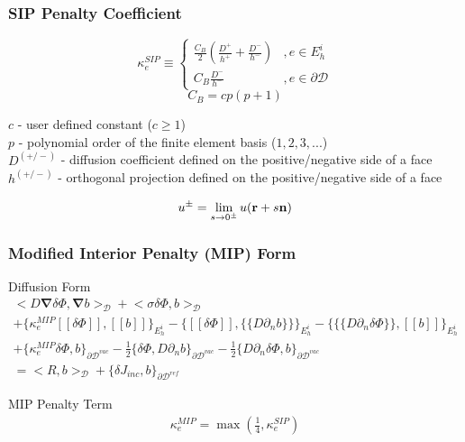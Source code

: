 \documentclass[compress,10pt]{beamer}
\renewcommand{\vec}[1]{\mathbf{#1}}
\begin{document}
\begin{frame}[t]\frametitle{SIP Penalty Coefficient}
\begin{block}{}{
	\begin{equation*}
		\kappa_e^{SIP} \equiv 
		\begin{cases}
		\frac{C_B}{2} \left(  \frac{D^+}{h^+} + \frac{D^-}{h^-}  \right) & , e \in E_h^i \\
		C_B \frac{D^-}{h^-}  & , e \in \partial \mathcal{D}
		\end{cases}
	\end{equation*}}
	\begin{equation*}
		C_B = c p (p+1)
	\end{equation*}
\end{block}
\begin{block}{}
$c$ - user defined constant ($c \geq 1$) \\
$p$ - polynomial order of the finite element basis ($1,2,3,...$) \\
$D^{(+/-)}$ - diffusion coefficient defined on the positive/negative side of a face\\
$h^{(+/-)}$ - orthogonal projection defined on the positive/negative side of a face
\end{block}
\begin{block}{}
	\begin{equation*}
		u^{\pm} = \lim_{s \rightarrow 0^{\pm}} u ({\bf r} + s {\bf n})
	\end{equation*}
\end{block}
\end{frame}
\begin{frame}[t]\frametitle{Modified Interior Penalty (MIP) Form}
	\begin{block}{Diffusion Form}{\footnotesize
		\begin{gather*}
			 \Big<  D \vec{\nabla} \delta \Phi , \vec{\nabla} b  \Big>_{\mathcal{D}} + \Big<  \sigma \delta  \Phi ,  b  \Big>_{\mathcal{D}}    \\
			+  \Big\{ \kappa_e^{MIP} [\![ \delta  \Phi ]\!] , [\![  b ]\!]\Big\}_{E_h^i} - \Big\{  [\![  \delta \Phi ]\!] , \{\!\{  D \partial_n b \}\!\}\Big\}_{E_h^i} -\Big\{ \{\!\{  D \partial_n \delta \Phi \}\!\} , [\![ b ]\!]\Big\}_{E_h^i} \\
			+ \Big\{ \kappa_e^{MIP} \delta  \Phi ,   b \Big\}_{\partial \mathcal{D}^{vac}} -  \frac{1}{2} \Big\{  \delta \Phi  ,  D \partial_n b \Big\}_{\partial \mathcal{D}^{vac}} -  \frac{1}{2} \Big\{   D 				\partial_n \delta \Phi ,   b \Big\}_{\partial \mathcal{D}^{vac}}  \\
 = \Big<  R , b  \Big>_{\mathcal{D}}  +  \Big\{  \delta J_{inc}, b  \Big\}_{\partial \mathcal{D}^{ref}}
        	\end{gather*} }
\end{block}
	\begin{block}{MIP Penalty Term}{\footnotesize
		\begin{align*}
			\kappa_e^{MIP} = \max(\frac{1}{4},  \kappa_e^{SIP})
		\end{align*} }
	\end{block}
\end{frame}
%
%
\end{document}
